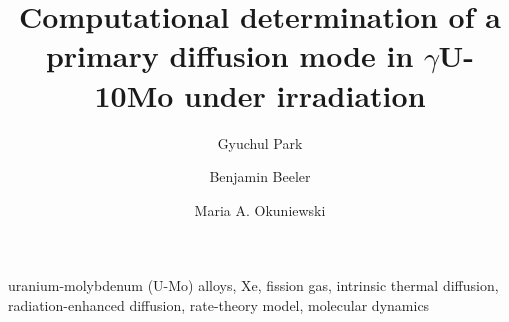\documentclass[preprint,12pt]{elsarticle}
\begin{document}
\begin{keyword} uranium-molybdenum (U-Mo) alloys, Xe, fission gas, intrinsic thermal diffusion, radiation-enhanced diffusion, rate-theory model, molecular dynamics
\end{keyword}
\onehalfspacing
\begin{frontmatter} 
\title{Computational determination of a primary diffusion mode in $\gamma$U-10Mo under irradiation}
\author[pur]{Gyuchul Park}
\author[ncsu,inl]{Benjamin Beeler}
\author[pur] {Maria A. Okuniewski}
\address[pur]{School of Materials Engineering, Purdue University, West Lafayette, IN 47907, United States}
\address[ncsu]{Department of Nuclear Engineering, North Carolina State University, Raleigh, NC 27695, United States}
\address[inl]{Idaho National Laboratory, Idaho Falls, ID 83415, United States}


\end{frontmatter}
\end{document}
